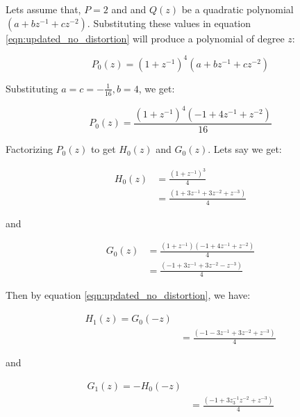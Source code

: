 Lets assume that, $P=2$ and and $Q(z)$ be a quadratic polynomial $(a + bz^{-1} + cz^{-2})$. Substituting these values in equation \ref{eqn:updated_no_distortion} will produce a polynomial of degree $z$:

\begin{equation} 
{P_0(z) = (1 + z^{-1})^4(a + bz^{-1} + cz^{-2})}
\end{equation}

Substituting $a = c = - \frac{1}{16}, b= 4$, we get:

\begin{equation} 
{P_0(z) = \frac{(1 + z^{-1})^4(-1 + 4z^{-1} + z^{-2})}{16}}
\end{equation}

Factorizing $P_0(z)$ to get $H_0(z)$ and $G_0(z)$. Lets say we get:

\begin{equation} \label{eq1}
\begin{split}
H_0(z) & = \frac{(1 + z^{-1})^3}{4} \\
& = \frac{(1 + 3z^{-1} + 3z^{-2} + z^{-3})}{4}
\end{split}
\end{equation}


and


\begin{equation} \label{eq1}
\begin{split}
G_0(z) & = \frac{(1 + z^{-1})(-1 + 4z^{-1} + z^{-2})}{4} \\
& = \frac{(-1 + 3z^{-1} + 3z^{-2} - z^{-3})}{4}
\end{split}
\end{equation}


Then by equation \ref{eqn:updated_no_distortion}, we have:


\begin{equation} \label{eq1}
\begin{split}
H_1(z) = G_0(-z) \\
& = \frac{(-1 - 3z^{-1} + 3z^{-2} + z^{-3})}{4}
\end{split}
\end{equation}

and

\begin{equation} \label{eq1}
\begin{split}
G_1(z) = -H_0(-z) \\
& = \frac{(-1 + 3z^{-1} _ 3z^{-2} + z^{-3})}{4}
\end{split}
\end{equation}

